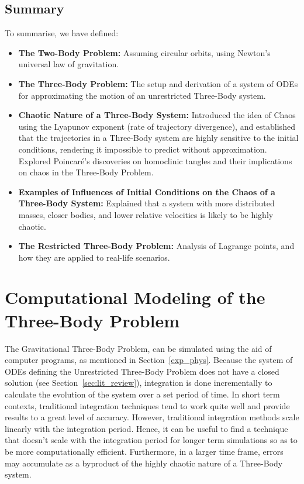 \documentclass[12pt]{article}
\begin{document}
\subsection{Summary}

To summarise, we have defined:

\begin{itemize}
    \item \textbf{The Two-Body Problem:} Assuming circular orbits, using Newton's universal law of gravitation.
    \item \textbf{The Three-Body Problem:} The setup and derivation of a system of ODEs for approximating the motion of an unrestricted Three-Body system.
    \item \textbf{Chaotic Nature of a Three-Body System:} Introduced the idea of Chaos using the Lyapunov exponent (rate of trajectory divergence), and established that the trajectories in a Three-Body system are highly sensitive to the initial conditions, rendering it impossible to predict without approximation. Explored Poincaré's discoveries on homoclinic tangles and their implications on chaos in the Three-Body Problem.
    \item \textbf{Examples of Influences of Initial Conditions on the Chaos of a Three-Body System:} Explained that a system with more distributed masses, closer bodies, and lower relative velocities is likely to be highly chaotic.
    \item \textbf{The Restricted Three-Body Problem:} Analysis of Lagrange points, and how they are applied to real-life scenarios.
\end{itemize}

\section{Computational Modeling of the Three-Body Problem}
\label{sec:comp_modeling}

The Gravitational Three-Body Problem, can be simulated using the aid of computer programs, as mentioned in Section~\ref{exp_phys}. Because the system of ODEs defining the Unrestricted Three-Body Problem does not have a closed solution (see Section~\ref{sec:lit_review}), integration is done incrementally to calculate the evolution of the system over a set period of time. In short term contexts, traditional integration techniques tend to work quite well and provide results to a great level of accuracy. However, traditional integration methods scale linearly with the integration period. Hence, it can be useful to find a technique that doesn't scale with the integration period for longer term simulations so as to be more computationally efficient. Furthermore, in a larger time frame, errors may accumulate as a byproduct of the highly chaotic nature of a Three-Body system.
\end{document}
